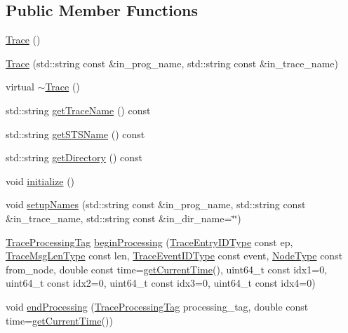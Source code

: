 \subsection*{Public Member Functions}
\begin{DoxyCompactItemize}
\item 
\hyperlink{structvt_1_1trace_1_1_trace_aaa01903c742a455c14331d0f3870285b}{Trace} ()
\item 
\hyperlink{structvt_1_1trace_1_1_trace_a33a81cc28bd249ed5b962cf314cb1873}{Trace} (std\+::string const \&in\+\_\+prog\+\_\+name, std\+::string const \&in\+\_\+trace\+\_\+name)
\item 
virtual \hyperlink{structvt_1_1trace_1_1_trace_a80b3426aed07572525ef4834b0c4dedd}{$\sim$\+Trace} ()
\item 
std\+::string \hyperlink{structvt_1_1trace_1_1_trace_a6825144c1fb635304c957dee8f667b4a}{get\+Trace\+Name} () const
\item 
std\+::string \hyperlink{structvt_1_1trace_1_1_trace_af92da7879adc530c72945530b0bfa11d}{get\+S\+T\+S\+Name} () const
\item 
std\+::string \hyperlink{structvt_1_1trace_1_1_trace_ae2e8213035c557a769cf0fd1a41533a5}{get\+Directory} () const
\item 
void \hyperlink{structvt_1_1trace_1_1_trace_a1fbfe3f8e6c19d8cfacb9bad97c45069}{initialize} ()
\item 
void \hyperlink{structvt_1_1trace_1_1_trace_af06d0567bb3c4953f6fc61e996dacda1}{setup\+Names} (std\+::string const \&in\+\_\+prog\+\_\+name, std\+::string const \&in\+\_\+trace\+\_\+name, std\+::string const \&in\+\_\+dir\+\_\+name=\char`\"{}\char`\"{})
\item 
\hyperlink{structvt_1_1trace_1_1_trace_processing_tag}{Trace\+Processing\+Tag} \hyperlink{structvt_1_1trace_1_1_trace_a5389adce729277dca43664902ead591e}{begin\+Processing} (\hyperlink{namespacevt_1_1trace_a3c14050715ba9eceaeff51fb3de64f2f}{Trace\+Entry\+I\+D\+Type} const ep, \hyperlink{namespacevt_1_1trace_aeb598f45d67d41db7902e494f2f0ce59}{Trace\+Msg\+Len\+Type} const len, \hyperlink{namespacevt_1_1trace_a64a7185f3e102df8d8258f263ccd1582}{Trace\+Event\+I\+D\+Type} const event, \hyperlink{namespacevt_a866da9d0efc19c0a1ce79e9e492f47e2}{Node\+Type} const from\+\_\+node, double const time=\hyperlink{structvt_1_1trace_1_1_trace_a04cf6b76b4ced1bc90d246a34c948db5}{get\+Current\+Time}(), uint64\+\_\+t const idx1=0, uint64\+\_\+t const idx2=0, uint64\+\_\+t const idx3=0, uint64\+\_\+t const idx4=0)
\item 
void \hyperlink{structvt_1_1trace_1_1_trace_a679d11cc0cc8f783610a825200f899b4}{end\+Processing} (\hyperlink{structvt_1_1trace_1_1_trace_processing_tag}{Trace\+Processing\+Tag} processing\+\_\+tag, double const time=\hyperlink{structvt_1_1trace_1_1_trace_a04cf6b76b4ced1bc90d246a34c948db5}{get\+Current\+Time}())

\end{DoxyCompactItemize}
